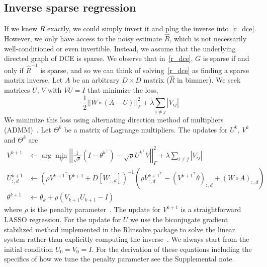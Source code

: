 \documentclass{article}
\begin{document}
\subsection{Inverse sparse regression}
If we knew $R$ exactly, we could simply invert it and plug the inverse
into~\eqref{r_dce}. However, we only have access to the noisy estimate $\hat{R}$,
which is not necessarily well-conditioned or even invertible. Instead, we assume that
the underlying directed graph of DCE is sparse. We observe that in~\eqref{r_dce}, $G$ is
sparse if and only if $\hat{R}^{-1}$ is sparse, and so we can think of
solving~\eqref{r_dce} as finding a sparse matrix inverse. Let $A$ be an arbitrary $D\times D$
matrix ($\hat{R}$ in bimmer). We seek matrices $U$, $V$ with $VU=I$ that minimize the loss,
\begin{equation}\label{opt_methods}
\frac{1}{2} ||W \circ (A - U)||_F^2 + \lambda \sum_{i\neq j}|V_{ij}|
\end{equation}
We minimize this loss using alternating direction method of multipliers (ADMM)~\cite{Boyd2010}.
Let $\Theta^k$ be a matrix of Lagrange multipliers. The updates for $U^k$, $V^k$ and $\Theta^k$
are
\begin{align}
V^{k+1} &\leftarrow \arg \min_{V} \left|\left|\frac{1}{\sqrt{\rho}}\left(I-\theta^{k^\top}\right) -
      \sqrt{\rho} U^{k^\top} V\right|\right|_F^2 + \lambda \sum_{i\neq j} \left|V_{ij} \right| \\
U_{:, d}^{k+1} &\leftarrow \left(\rho V^{k+1 ^ \top} V^{k+1} + D[W_{:, d}]\right)^{-1} \left(\rho V^{k+1 ^ \top}_{:, d} -
  \left(V^{k+1 ^ \top} \theta\right)_{:, d} + (W \circ A)_{:, d}\right) \\
\theta^{k+1} &\leftarrow \theta_{k} + \rho(V_{k+1}U_{k+1}-I)
\end{align}
where $\rho$ is the penalty parameter~\cite{Boyd2010}.
The update for $V^{k+1}$ is a straightforward LASSO regression. For the update for $U$ 
we use the biconjugate gradient stabilized method implemented
in the Rlinsolve package to solve the linear system
rather than explicitly computing the inverse~\cite{You2018}.
We always start from the initial condition $U_0 = V_0 = I$.
 For the derivation of these equations including
the specifics of how we tune
the penalty parameter see the Supplemental note.
\end{document}
